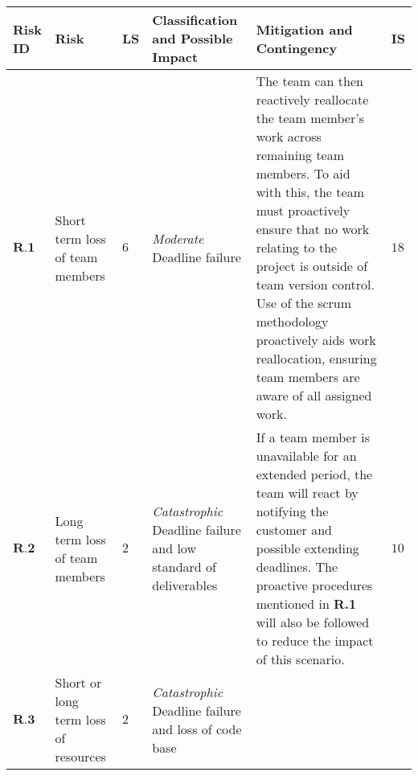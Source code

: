 \begin{longtable}[H]{| p{0.6cm} | p{2cm} | p{0.3cm} | p{2.6cm} | p{8.1cm} | p{0.7cm} |}
    \hline
    \cellcolor{titleColor}\textbf{Risk ID}   & \cellcolor{titleColor}\textbf{Risk}                                             &\cellcolor{titleColor}\textbf{LS}        & \cellcolor{titleColor}\textbf{Classification and Possible Impact}                                 & \cellcolor{titleColor}\textbf{Mitigation and Contingency} & \cellcolor{titleColor}\textbf{IS} \\ \hline                                                                                                                                                                                                                                                                                                                                                                                                                                                                                                                                
    $\textbf{R.1}$   & Short term loss of team members                  & $6$       & \textit{Moderate}
\newline Deadline failure                                        
      &  The team can then reactively reallocate the team member's work across remaining team members. To aid with this, the team must proactively ensure that no work relating to the project is outside of team version control. Use of the scrum methodology proactively aids work reallocation, ensuring team members are aware of all assigned work. 
      & $18$    \\ \hline
    $\textbf{R.2}$    & Long term loss of team members                   & $2$ & \textit{Catastrophic}
\newline Deadline failure and low standard of deliverables 
    & If a team member is unavailable for an extended period, the team will react by notifying the customer and possible extending deadlines. The proactive procedures mentioned in \textbf{R.1} will also be followed to reduce the impact of this scenario.                                                                                                                                                                                                                                                                                            
    & $10$    \\ \hline
    $\textbf{R.3}$     & Short or long term loss of resources             & $2$ & \textit{Catastrophic}
\newline Deadline failure and loss of code base              

\end{longtable}
